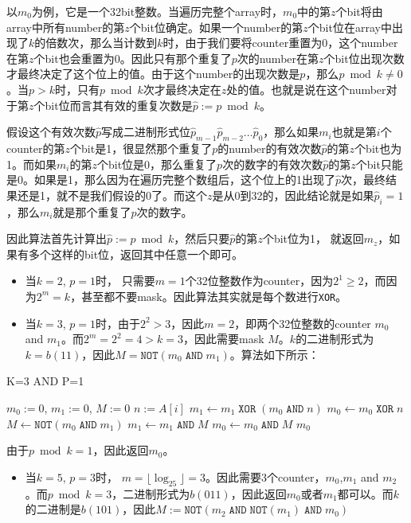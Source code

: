 以$m_0$为例，它是一个32bit整数。当遍历完整个array时，$m_0$中的第$z$个bit将由array中所有number的第$z$个bit位确定。如果一个number的第$z$个bit位在array中出现了$k$的倍数次，那么当计数到$k$时，由于我们要将counter重置为0，这个number在第$z$个bit也会重置为0。因此只有那个重复了$p$次的number在第$z$个bit位出现次数才最终决定了这个位上的值。由于这个number的出现次数是$p$，那么$p\bmod k\neq0$。当$p>k$时，只有$p\bmod k$次才最终决定在$z$处的值。也就是说在这个number对于第$z$个bit位而言其有效的重复次数是$\hat{p}:=p\bmod k$。

假设这个有效次数$\hat{p}$写成二进制形式位$\hat{p}_{m-1}\hat{p}_{m-2}\ldots\hat{p}_0$，那么如果$m_i$也就是第$i$个counter的第$z$个bit是1，很显然那个重复了$p$的number的有效次数$\hat{p}$的第$z$个bit也为1。而如果$m_i$的第$z$个bit位是0，那么重复了$p$次的数字的有效次数$\hat{p}$的第$z$个bit只能是0。如果是1，那么因为在遍历完整个数组后，这个位上的1出现了$\hat{p}$次，最终结果还是1，就不是我们假设的0了。而这个$z$是从0到32的，因此结论就是如果$\hat{p}_i=1$，那么$m_i$就是那个重复了$p$次的数字。

因此算法首先计算出$\hat{p}:=p\bmod k$，然后只要$\hat{p}$的第$z$个bit位为1， 就返回$m_z$，如果有多个这样的bit位，返回其中任意一个即可。

\begin{itemize}
\item 当$k=2$, $p=1$时， 只需要$m=1$个32位整数作为counter，因为$2^1\geq2$，而因为$2^m=k$，甚至都不要mask。因此算法其实就是每个数进行\texttt{XOR}。
\item 当$k=3$, $p=1$时，由于$2^2>3$，因此$m=2$，即两个32位整数的counter $m_0$ and $m_1$。而$2^m=2^2=4>k=3$，因此需要mask $M$。$k$的二进制形式为$k=b(11)$，因此$M = \texttt{NOT}(m_0\;\texttt{AND}\;m_1)$。算法如下所示：
\end{itemize}


\setcounter{algorithm}{0}
\begin{algorithm}[H]
\caption{K=3 AND P=1}
\begin{algorithmic}[1]
\State $m_0:=0$, $m_1:=0$, $M:=0$
\State $n:=A[i]$
\State $m_1\gets m_1\;\texttt{XOR}\;(m_0\;\texttt{AND}\;n)$
\State $m_0\gets m_0\;\texttt{XOR}\;n$
\State $M\gets \texttt{NOT}(m_0\;\texttt{AND}\;m_1)$
\State $m_1\gets m_1\;\texttt{AND}\;M$
\State $m_0\gets m_0\;\texttt{AND}\;M$
\EndFor
\State \Return $m_0$
\EndProcedure
\end{algorithmic}
\end{algorithm}
由于$p\bmod k=1$，因此返回$m_0$。
\begin{itemize}
\item 当$k=5$, $p=3$时， $m=\lfloor\log_25\rfloor=3$。因此需要3个counter，$m_0$,$m_1$ and $m_2$。而$p\bmod k=3$，二进制形式为$b(011)$，因此返回$m_0$或者$m_1$都可以。而$k$的二进制是$b(101)$，因此$M:=\texttt{NOT}(m_2\;\texttt{AND}\;\texttt{NOT}(m_1)\;\texttt{AND}\;m_0)$
\end{itemize}

